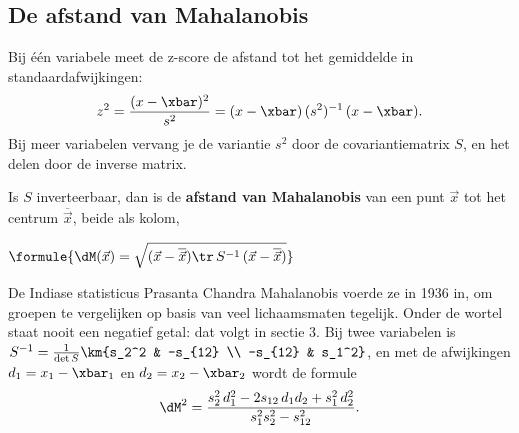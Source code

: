 \subsection{De afstand van Mahalanobis}

Bij één variabele meet de z-score de afstand tot het gemiddelde in standaardafwijkingen:
\[ z^2 = \frac{(x - \xbar)^2}{s^2} = (x - \xbar)\,(s^2)^{-1}\,(x - \xbar) . \]
Bij meer variabelen vervang je de variantie $s^2$ door de covariantiematrix $S$, en het delen door de inverse matrix.

\begin{theorie}
Is $S$ inverteerbaar, dan is de \textbf{\textcolor{accent}{afstand van Mahalanobis}} van een punt $\vec x$ tot het centrum $\overline{\vec x}$, beide als kolom,

\vspace{1mm}
\qquad $\formule{\dM(\vec x) = \sqrt{(\vec x - \overline{\vec x})\tr\,S^{-1}\,(\vec x - \overline{\vec x})}}$
\end{theorie}

De Indiase statisticus Prasanta Chandra Mahalanobis voerde ze in 1936 in, om groepen te vergelijken op basis van veel lichaamsmaten tegelijk. Onder de wortel staat nooit een negatief getal: dat volgt in sectie 3. Bij twee variabelen is $S^{-1} = \frac{1}{\det S}\km{s_2^2 & -s_{12} \\ -s_{12} & s_1^2}$, en met de afwijkingen $d_1 = x_1 - \xbar_1$ en $d_2 = x_2 - \xbar_2$ wordt de formule
\[ \dM^2 = \frac{s_2^2\,d_1^2 - 2s_{12}\,d_1d_2 + s_1^2\,d_2^2}{s_1^2s_2^2 - s_{12}^2} . \]


